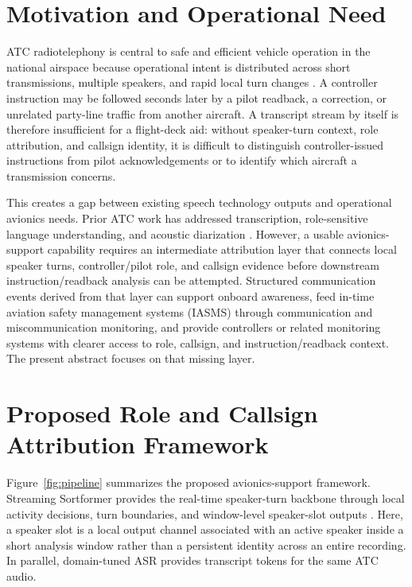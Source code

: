 \documentclass[10pt]{article}
\begin{document}
\section*{Motivation and Operational Need}

ATC radiotelephony is central to safe and efficient vehicle operation in the national airspace because operational intent is distributed across short transmissions, multiple speakers, and rapid local turn changes \cite{godfrey1994atcc,wang2024enhancing}. A controller instruction may be followed seconds later by a pilot readback, a correction, or unrelated party-line traffic from another aircraft. A transcript stream by itself is therefore insufficient for a flight-deck aid: without speaker-turn context, role attribution, and callsign identity, it is difficult to distinguish controller-issued instructions from pilot acknowledgements or to identify which aircraft a transmission concerns.

This creates a gap between existing speech technology outputs and operational avionics needs. Prior ATC work has addressed transcription, role-sensitive language understanding, and acoustic diarization \cite{wang2024enhancing,zuluaga2022bertraffic,park2024sortformer,medennikov2025streaming}. However, a usable avionics-support capability requires an intermediate attribution layer that connects local speaker turns, controller/pilot role, and callsign evidence before downstream instruction/readback analysis can be attempted. Structured communication events derived from that layer can support onboard awareness, feed in-time aviation safety management systems (IASMS) through communication and miscommunication monitoring, and provide controllers or related monitoring systems with clearer access to role, callsign, and instruction/readback context. The present abstract focuses on that missing layer.

\section*{Proposed Role and Callsign Attribution Framework}

Figure~\ref{fig:pipeline} summarizes the proposed avionics-support framework. Streaming Sortformer provides the real-time speaker-turn backbone through local activity decisions, turn boundaries, and window-level speaker-slot outputs \cite{park2024sortformer,medennikov2025streaming}. Here, a speaker slot is a local output channel associated with an active speaker inside a short analysis window rather than a persistent identity across an entire recording. In parallel, domain-tuned ASR provides transcript tokens for the same ATC audio.
\end{document}
